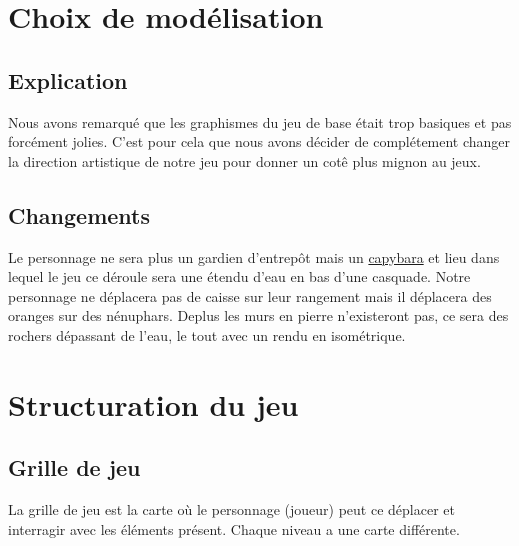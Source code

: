 \documentclass[french, 12pt]{article}
\begin{document}
\section{Choix de  modélisation} %

    \subsection{Explication}
        Nous avons remarqué que les graphismes du jeu de base était trop basiques et pas forcément jolies. C'est pour cela que nous avons décider de complétement changer la direction artistique de notre jeu pour donner un cotê plus mignon au jeux.

    \subsection{Changements}
        Le personnage ne sera plus un gardien d'entrepôt mais un \href{https://fr.wikipedia.org/wiki/Hydrochoerus_hydrochaeris}{capybara} et lieu dans lequel le jeu ce déroule sera une étendu d'eau en bas d'une casquade. Notre personnage ne déplacera pas de caisse sur leur rangement mais il déplacera des oranges sur des nénuphars. 
        Deplus les murs en pierre n'existeront pas, ce sera des rochers dépassant de l'eau, le tout avec un rendu en isométrique.



\section{Structuration du jeu}

    \subsection{Grille de jeu}
        La grille de jeu est la carte où le personnage (joueur) peut ce déplacer et interragir avec les éléments présent. Chaque niveau a une carte différente.
\end{document}
